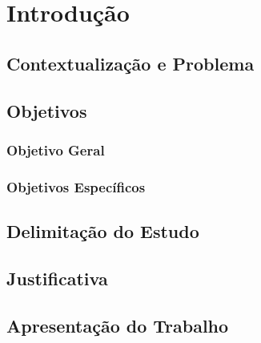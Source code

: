 


\chapter{Introdução}
    \label{cha:intro}
    \markright{}            %

    \section{Contextualização e Problema}
        \label{subsec:contextualizacao-problema}
    
    \section{Objetivos}
        \label{sec:objetivos}
    
        \subsection{Objetivo Geral}
            \label{subsec:objetivo-geral}
    
        \subsection{Objetivos Específicos}
            \label{subsec:objetivos-especificos}
    
    \section{Delimitação do Estudo}
        \label{sec:delimitacao-estudo}
    
    \section{Justificativa}
        \label{sec:justificativa}
    
    \section{Apresentação do Trabalho}
        \label{sec:apresentacao-trabalho}

